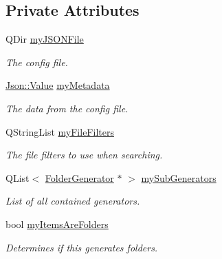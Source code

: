 \subsection*{Private Attributes}
\begin{DoxyCompactItemize}
\item 
\hypertarget{class_a_w_e_1_1_folder_generator_ae806a0cfb1ae6b9edfec8e319fafcfd5}{Q\-Dir \hyperlink{class_a_w_e_1_1_folder_generator_ae806a0cfb1ae6b9edfec8e319fafcfd5}{my\-J\-S\-O\-N\-File}}\label{class_a_w_e_1_1_folder_generator_ae806a0cfb1ae6b9edfec8e319fafcfd5}

\begin{DoxyCompactList}\small\item\em The config file. \end{DoxyCompactList}\item 
\hypertarget{class_a_w_e_1_1_folder_generator_a3e073e7f3223ec418692baba94bf5872}{\hyperlink{class_json_1_1_value}{Json\-::\-Value} \hyperlink{class_a_w_e_1_1_folder_generator_a3e073e7f3223ec418692baba94bf5872}{my\-Metadata}}\label{class_a_w_e_1_1_folder_generator_a3e073e7f3223ec418692baba94bf5872}

\begin{DoxyCompactList}\small\item\em The data from the config file. \end{DoxyCompactList}\item 
\hypertarget{class_a_w_e_1_1_folder_generator_a5e85a244539068c674dc66116e5bf210}{Q\-String\-List \hyperlink{class_a_w_e_1_1_folder_generator_a5e85a244539068c674dc66116e5bf210}{my\-File\-Filters}}\label{class_a_w_e_1_1_folder_generator_a5e85a244539068c674dc66116e5bf210}

\begin{DoxyCompactList}\small\item\em The file filters to use when searching. \end{DoxyCompactList}\item 
\hypertarget{class_a_w_e_1_1_folder_generator_a460b960f16e47bd9f83b8a2879d953db}{Q\-List$<$ \hyperlink{class_a_w_e_1_1_folder_generator}{Folder\-Generator} $\ast$ $>$ \hyperlink{class_a_w_e_1_1_folder_generator_a460b960f16e47bd9f83b8a2879d953db}{my\-Sub\-Generators}}\label{class_a_w_e_1_1_folder_generator_a460b960f16e47bd9f83b8a2879d953db}

\begin{DoxyCompactList}\small\item\em List of all contained generators. \end{DoxyCompactList}\item 
\hypertarget{class_a_w_e_1_1_folder_generator_acdca8c578a81e5065bd163fa446270d1}{bool \hyperlink{class_a_w_e_1_1_folder_generator_acdca8c578a81e5065bd163fa446270d1}{my\-Items\-Are\-Folders}}\label{class_a_w_e_1_1_folder_generator_acdca8c578a81e5065bd163fa446270d1}

\begin{DoxyCompactList}\small\item\em Determines if this generates folders. \end{DoxyCompactList}\end{DoxyCompactItemize}


